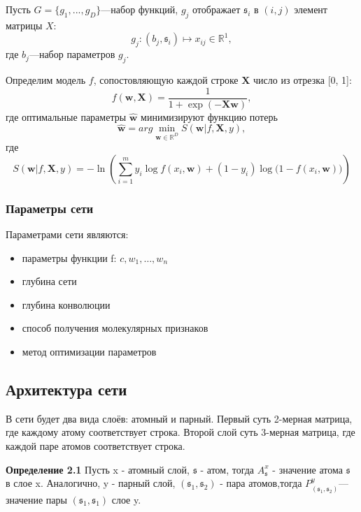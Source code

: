 \documentclass[12pt,twoside]{article}
\begin{document}
	Пусть $G = \{g_1,...,g_{D}\}$---набор функций, $g_j$ отображает $\mathfrak{s}_i$ в $(i, j)$ элемент матрицы $X$: $$g_j: (b_j, \mathfrak{s}_i)\mapsto x_{ij} \in \mathbb{R}^1,$$ где $b_j$---набор параметров $g_j$.
	
	Определим модель $f$, сопостовляющую каждой строке $\mathbf{X}$ число из отрезка [0, 1]: $$f(\mathbf{w}, \mathbf{X}) = \frac{1}{1+\exp(-\mathbf{Xw})},$$ где оптимальные параметры $\hat{\mathbf{w}}$ минимизируют функцию потерь $$\hat{\mathbf{w}}=arg\min\limits_{\mathbf{w} \in \mathbb{R}^{D}} S(\mathbf{w}|f, \mathbf{X}, y),$$ где $$S(\mathbf{w}|f, \mathbf{X}, y)=-\ln\left(\sum_{i=1}^m {y_i \log f(x_i, \mathbf{w}) + (1-y_i)\log\bigl(1-f(x_i, \mathbf{w})\bigr)}\right)$$

\subsubsection{Параметры сети}
Параметрами сети являются:
\begin{itemize}
\item параметры функции f: $c, w_1,\dots,w_n$
\item глубина сети
\item глубина конволюции
\item способ получения молекулярных признаков
\item метод оптимизации параметров
\end{itemize}

\subsection{Архитектура сети}
	В сети будет два вида слоёв: атомный и парный. Первый суть 2-мерная матрица, где каждому атому соответствует строка. Второй слой суть 3-мерная матрица, где каждой паре атомов соответствует строка.
	
	\textbf{Определение 2.1} Пусть x - атомный слой, $\mathfrak{s}$ - атом, тогда $A^x_\mathfrak{s}$ - значение атома $\mathfrak{s}$ в слое x. Аналогично, y - парный слой, $(\mathfrak{s}_1, \mathfrak{s}_2)$ - пара атомов,тогда $P^y_{(\mathfrak{s}_1, \mathfrak{s}_2)}$---значение пары $(\mathfrak{s}_1, \mathfrak{s}_1)$ слое y.
	
\end{document}
